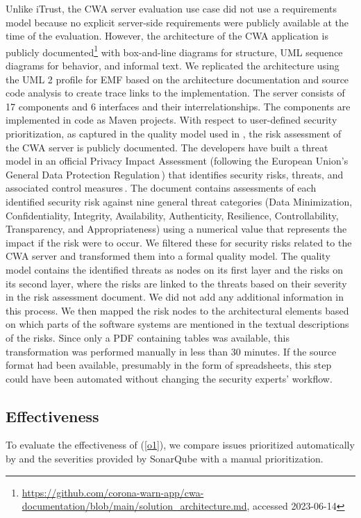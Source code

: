 Unlike iTrust, the CWA server evaluation use case did not use a requirements model because no explicit server-side requirements were publicly available at the time of the evaluation.
However, the architecture of the CWA application is publicly documented\footnote{\url{https://github.com/corona-warn-app/cwa-documentation/blob/main/solution_architecture.md}, accessed 2023-06-14} with box-and-line diagrams for structure, UML sequence diagrams for behavior, and informal text. We replicated the architecture using the UML 2 profile for EMF based on the architecture documentation and source code analysis to create trace links to the implementation. The server consists of 17 components and 6 interfaces and their interrelationships.
The components are implemented in code as Maven projects.
With respect to user-defined security prioritization, as captured in the quality model used in \appr{}, the risk assessment of the CWA server is publicly documented.
The developers have built a threat model in an official Privacy Impact Assessment (following the European Union's General Data Protection Regulation\,\cite{GDPR2016}) that identifies security risks, threats, and associated control measures\,\cite{CWA.DSFA.v1.20, CWA.DSFA.A8}.
The document contains assessments of each identified security risk against nine general threat categories (Data Minimization, Confidentiality, Integrity, Availability, Authenticity, Resilience, Controllability, Transparency, and Appropriateness) using a numerical value that represents the impact if the risk were to occur.
We filtered these for security risks related to the CWA server and transformed them into a formal quality model.
The quality model contains the identified threats as nodes on its first layer and the risks on its second layer, where the risks are linked to the threats based on their severity in the risk assessment document.
We did not add any additional information in this process.
We then mapped the risk nodes to the architectural elements based on which parts of the software systems are mentioned in the textual descriptions of the risks.
Since only a PDF containing tables was available, this transformation was performed manually in less than 30 minutes.
If the source format had been available, presumably in the form of spreadsheets, this step could have been automated without changing the security experts' workflow.

\subsection{Effectiveness}
To evaluate the effectiveness of \appr{} (\ref{o1}), we compare issues prioritized automatically by \appr{} and the severities provided by SonarQube with a manual prioritization.

